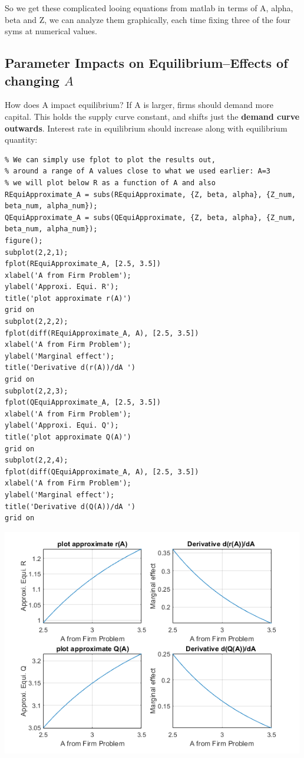 \documentclass[
]{book}
\begin{document}
So we get these complicated looing equations from matlab in terms of A,
alpha, beta and Z, we can analyze them graphically, each time fixing
three of the four syms at numerical values.

\hypertarget{parameter-impacts-on-equilibriumeffects-of-changing-a}{%
\subsection{\texorpdfstring{Parameter Impacts on Equilibrium--Effects of changing \(A\)}{Parameter Impacts on Equilibrium--Effects of changing A}}\label{parameter-impacts-on-equilibriumeffects-of-changing-a}}

How does A impact equilibrium? If A is larger, firms should demand more
capital. This holds the supply curve constant, and shifts just the
\textbf{demand curve outwards}. Interest rate in equilibrium should increase
along with equilibrium quantity:

\begin{verbatim}
% We can simply use fplot to plot the results out, 
% around a range of A values close to what we used earlier: A=3
% we will plot below R as a function of A and also 
REquiApproximate_A = subs(REquiApproximate, {Z, beta, alpha}, {Z_num, beta_num, alpha_num});
QEquiApproximate_A = subs(QEquiApproximate, {Z, beta, alpha}, {Z_num, beta_num, alpha_num});
figure();
subplot(2,2,1);
fplot(REquiApproximate_A, [2.5, 3.5])
xlabel('A from Firm Problem');
ylabel('Approxi. Equi. R');
title('plot approximate r(A)')
grid on
subplot(2,2,2);
fplot(diff(REquiApproximate_A, A), [2.5, 3.5])
xlabel('A from Firm Problem');
ylabel('Marginal effect');
title('Derivative d(r(A))/dA ')
grid on
subplot(2,2,3);
fplot(QEquiApproximate_A, [2.5, 3.5])
xlabel('A from Firm Problem');
ylabel('Approxi. Equi. Q');
title('plot approximate Q(A)')
grid on
subplot(2,2,4);
fplot(diff(QEquiApproximate_A, A), [2.5, 3.5])
xlabel('A from Firm Problem');
ylabel('Marginal effect');
title('Derivative d(Q(A))/dA ')
grid on
\end{verbatim}

\includegraphics[width=5.20833in,height=\textheight]{img/demand_supply_taylor_approximate_capital_images/figure_1.png}
\end{document}

